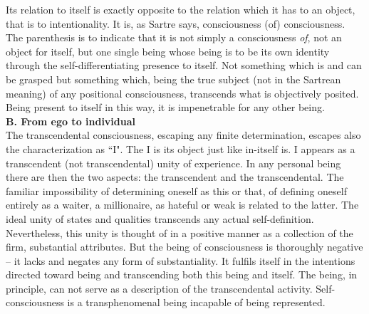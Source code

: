 Its relation to itself is exactly opposite to the relation which it has to an object, that is to intentionality. It is, as 
Sartre says, consciousness (of) consciousness. The parenthesis is to indicate that it is not simply a consciousness 
{\em of}, not an object for itself, but one single being whose being is to be its own identity through the self-differentiating presence to itself. Not something which is and can be grasped but something which, being the true 
subject (not in the Sartrean meaning) of any positional consciousness, transcends what is objectively posited. 
Being present to itself in this way, it is impenetrable for any other being. \\[1ex]
{\bf B. From ego to individual} \\
The transcendental consciousness, escaping any finite determination, escapes also the characterization as ``I". 
The I is its object just like in-itself is. I appears as a transcendent (not transcendental) unity of experience. In 
any personal being there are then the two aspects: the transcendent and the transcendental. The familiar 
impossibility of determining oneself as this or that, of defining oneself entirely as a waiter, a millionaire, as  
hateful or weak is related to the latter. The ideal unity of states and qualities transcends any actual self-definition. 
Nevertheless, this unity is thought of in a positive manner as a collection of the firm, substantial attributes. But 
the being of consciousness is thoroughly negative -- it lacks and negates any form of substantiality. It fulfils itself 
in the intentions directed toward being and transcending both this being and itself. The being, in principle, can not 
serve as a description of the transcendental activity. Self-consciousness is a transphenomenal being incapable of 
being represented.


